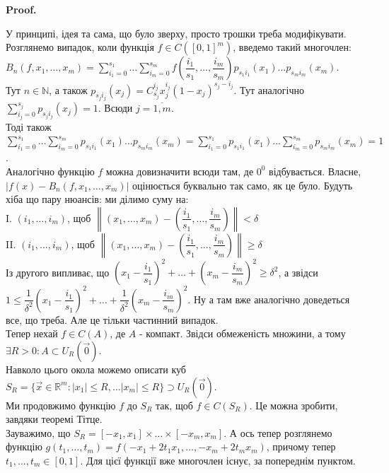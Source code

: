\documentclass[a4paper, 10pt]{article}
\makeatletter
\def\qed{$\blacksquare$}
\theoremstyle{theoremdd}
\theoremstyle{theoremdd}
\theoremstyle{theoremdd}
\theoremstyle{theoremdd}
\theoremstyle{theoremdd}
\theoremstyle{theoremdd}
\theoremstyle{theoremdd}
\theoremstyle{theoremdd}
\renewenvironment{proof}[1][Proof.\\]{\par
\pushQED{\hfill \qed}%
\normalfont \topsep6\p@\@plus6\p@\relax
\trivlist
\item\relax
{\bfseries
#1\@addpunct{.}}\hspace\labelsep\ignorespaces
}{%
\popQED\endtrivlist\@endpefalse
}
\newcommand\Norm[1]{\left\lVert#1\right\rVert}
\makeatother
\begin{document}
\begin{proof}
У принципі, ідея та сама, що було зверху, просто трошки треба модифікувати.\\
Розглянемо випадок, коли функція $f \in C([0,1]^m)$, введемо такий многочлен:\\
$B_n(f,x_1,\dots,x_m) = \displaystyle\sum_{i_1=0}^{s_1} \dots \sum_{i_m=0}^{s_m} f\left( \dfrac{i_1}{s_1},\dots,\dfrac{i_m}{s_m} \right) p_{s_1 i_1}(x_1) \dots p_{s_m i_m}(x_m)$.\\
Тут $n \in \mathbb{N}$, а також $p_{s_j i_j}(x_j) = C_{s_j}^{i_j} x_j^{i_j}(1-x_j)^{s_j-i_j}$. Тут аналогічно $\displaystyle\sum_{i_j=0}^{s_j} p_{s_ji_j}(x_j) = 1$. Всюди $j = \overline{1,m}$.\\
Тоді також $\displaystyle\sum_{i_1=0}^{s_1} \dots \sum_{i_m=0}^{s_m} p_{s_1i_1}(x_1) \dots p_{s_m i_m}(x_m) = \sum_{i_1=0}^{s_1} p_{s_1i_1}(x_1) \dots \sum_{i_m = 0}^{s_m} p_{s_m i_m}(x_m) = 1$.\\
Аналогічно функцію $f$ можна довизначити всюди там, де $0^0$ відбувається. Власне,\\
$|f(x) - B_n(f,x_1,\dots,x_m)|$ оцінюється буквально так само, як це було. Будуть хіба що пару нюансів: ми ділимо суму на: \\
I. $(i_1,\dots,i_m)$, щоб $\Norm{(x_1,\dots,x_m) - \left(\dfrac{i_1}{s_1},\dots,\dfrac{i_m}{s_m} \right)} < \delta$\\
II. $(i_1,\dots,i_m)$, щоб $\Norm{(x_1,\dots,x_m) - \left(\dfrac{i_1}{s_1},\dots,\dfrac{i_m}{s_m} \right)} \geq \delta$\\
Із другого випливає, що $\left( x_1 - \dfrac{i_1}{s_1}\right)^2 + \dots + \left( x_m - \dfrac{i_m}{s_m} \right)^2 \geq \delta^2$, а звідси\\
$1 \leq \dfrac{1}{\delta^2} \left( x_1 - \dfrac{i_1}{s_1}\right)^2 + \dots + \dfrac{1}{\delta^2} \left( x_m - \dfrac{i_m}{s_m}\right)^2$. Ну а там вже аналогічно доведеться все, що треба. Але це тільки частинний випадок.\\
Тепер нехай $f \in C(A)$, де $A$ - компакт. Звідси обмеженість множини, а тому $\exists R > 0: A \subset U_R(\vec{0})$.\\
Навколо цього окола можемо описати куб $S_R = \{ \vec{x} \in \mathbb{R}^m: |x_1| \leq R, \dots |x_m| \leq R \} \supset U_R(\vec{0})$.\\
Ми продовжимо функцію $f$ до $S_R$ так, щоб $f \in C(S_R)$. Це можна зробити, завдяки теоремі Тітце.\\
Зауважимо, що $S_R = [-x_1,x_1] \times \dots \times [-x_m,x_m]$. А ось тепер розглянемо функцію $g(t_1,\dots,t_m) = f(-x_1+2t_1x_1, \dots, -x_m+2t_mx_m)$, причому тепер $t_1,\dots,t_m \in [0,1]$. Для цієї функції вже многочлен існує, за попереднім пунктом.
\end{proof}
\end{document}
